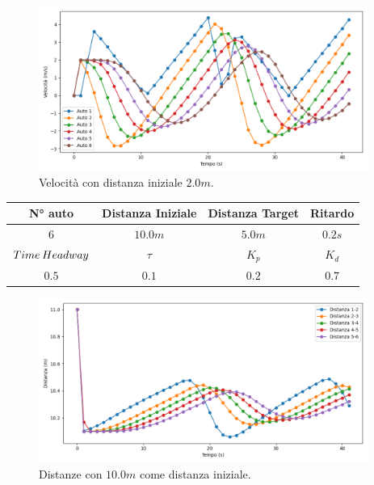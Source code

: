 \begin{figure}[H]
    \includegraphics[width=0.96\textwidth]{images/5-experiment/car-spacing/velocity_2.png}
    \caption{Velocità con distanza iniziale $2.0 m$.}
    \label{fig:2-space-velocity}
\end{figure}
\vspace*{\fill}
\newpage
\vspace*{\fill}
\begin{table}[h]
    \centering
    \begin{tabular}{|c|c|c|c|}
        \hline
        N° auto & Distanza Iniziale & Distanza Target & Ritardo \\
        \hline
        $6$ & $10.0 m$ & $5.0 m$ & $0.2 s$ \\
        \hline
        $Time\hspace{0.2em}Headway$ & $\tau$ & $K_p$ & $K_d$  \\
        \hline
        $0.5$ & $0.1$ & $0.2$ & $0.7$ \\
        \hline
    \end{tabular}
\end{table}
\begin{figure}[H]
    \includegraphics[width=0.96\textwidth]{images/5-experiment/car-spacing/distance_10.png}
    \caption{Distanze con $10.0 m$ come distanza iniziale.}
    \label{fig:10-space-distance}
\end{figure}

